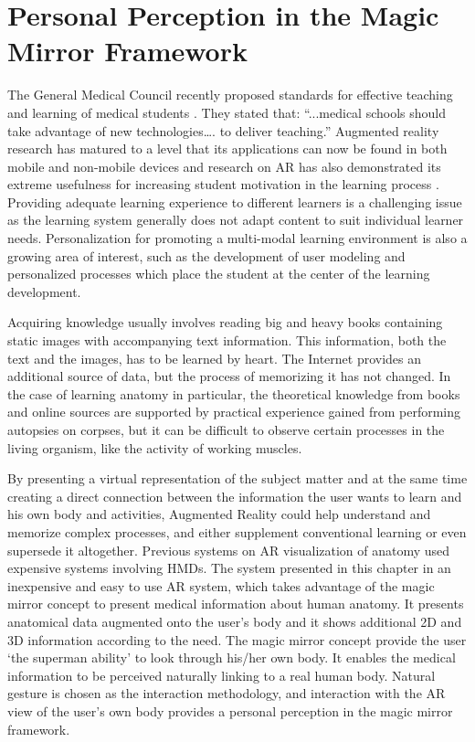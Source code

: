 
\chapter{Personal Perception in the Magic Mirror Framework}
The General Medical Council recently proposed standards for effective teaching and learning of medical students \cite{Council2009}. They stated that: ``...medical schools should take advantage of new technologies…. to deliver teaching.'' Augmented reality research has matured to a level that its applications can now be found in both mobile and non-mobile devices \cite{Bacca2014} and research on AR has also demonstrated its extreme usefulness for increasing student motivation in the learning process \cite{Chang2014,DiSerio2013}. Providing adequate learning experience to different learners is a challenging issue as the learning system generally does not adapt content to suit individual learner needs. Personalization for promoting a multi-modal learning environment is also a growing area of interest, such as the development of user modeling and personalized processes which place the student at the center of the learning development.

Acquiring knowledge usually involves reading big and heavy books containing static images with accompanying text information. This information, both the text and the
images, has to be learned by heart. The Internet provides an additional source of data, but the process of memorizing it has not changed. In the case of learning anatomy in particular, the theoretical knowledge from books and online sources are supported by practical experience gained from performing autopsies on corpses, but it can be difficult to observe certain processes in the living organism, like the activity of working muscles.

By presenting a virtual representation of the subject matter and at the same time creating a direct connection between the information the user wants to learn and his own body and activities, Augmented Reality could help understand and memorize complex processes, and either supplement conventional learning or even supersede it altogether. Previous systems on AR visualization of anatomy used expensive systems involving HMDs. The system presented in this chapter in an inexpensive and easy to use AR system, which takes advantage of the magic mirror concept to present medical information about human anatomy. It presents anatomical data augmented onto the user's body and it shows additional 2D and 3D information according to the need. The magic mirror concept provide the user `the superman ability' to look through his/her own body. It enables the medical information to be perceived naturally linking to a real human body. Natural gesture is chosen as the interaction methodology, and interaction with the AR view of the user's own body provides a personal perception in the magic mirror framework.

